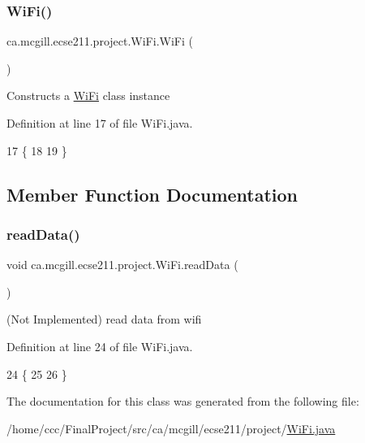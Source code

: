 \subsubsection{\texorpdfstring{Wi\+Fi()}{WiFi()}}
{\footnotesize\ttfamily ca.\+mcgill.\+ecse211.\+project.\+Wi\+Fi.\+Wi\+Fi (\begin{DoxyParamCaption}{ }\end{DoxyParamCaption})}

Constructs a \hyperlink{classca_1_1mcgill_1_1ecse211_1_1project_1_1_wi_fi}{Wi\+Fi} class instance 

Definition at line 17 of file Wi\+Fi.\+java.


\begin{DoxyCode}
17                 \{
18     
19   \}
\end{DoxyCode}


\subsection{Member Function Documentation}
\mbox{\label{classca_1_1mcgill_1_1ecse211_1_1project_1_1_wi_fi_aa40dba958b0bb4cc8cb5aeae636e3b08}} 
\subsubsection{\texorpdfstring{read\+Data()}{readData()}}
{\footnotesize\ttfamily void ca.\+mcgill.\+ecse211.\+project.\+Wi\+Fi.\+read\+Data (\begin{DoxyParamCaption}{ }\end{DoxyParamCaption})}

(Not Implemented) read data from wifi 

Definition at line 24 of file Wi\+Fi.\+java.


\begin{DoxyCode}
24                          \{
25     
26   \}
\end{DoxyCode}


The documentation for this class was generated from the following file\+:\begin{DoxyCompactItemize}
\item 
/home/ccc/\+Final\+Project/src/ca/mcgill/ecse211/project/\hyperlink{_wi_fi_8java}{Wi\+Fi.\+java}\end{DoxyCompactItemize}

